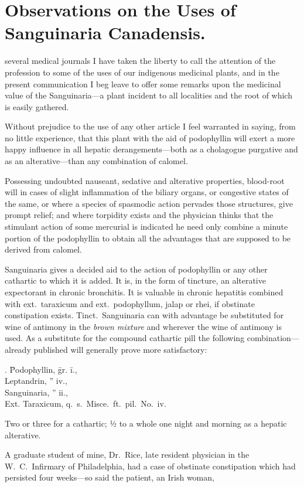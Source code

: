 \section{Observations on the Uses of Sanguinaria
Canadensis.}


 several medical journals I have taken the liberty to call the attention
of the profession to some of the uses of our indigenous medicinal
plants, and in the present communication I beg leave to offer some
remarks upon the medicinal value of the Sanguinaria---a plant incident
to all localities and the root of which is easily gathered.

Without prejudice to the use of any other article I feel warranted in
saying, from no little experience, that this plant with the aid of podophyllin
will exert a more happy influence in all hepatic derangements---both
as a cholagogue purgative and as an alterative---than any combination
of calomel.

Possessing undoubted nauseant, sedative and alterative properties,
blood-root will in cases of slight inflammation of the biliary organs, or
congestive states of the same, or where a species of spasmodic action
pervades those structures, give prompt relief; and where torpidity
exists and the physician thinks that the stimulant action of some mercurial
is indicated he need only combine a minute portion of the
podophyllin to obtain all the advantages that are supposed to be
derived from calomel.

Sanguinaria gives a decided aid to the action of podophyllin or any
other cathartic to which it is added.   It is, in the form of tincture, an
alterative expectorant in chronic bronchitis.   It is valuable in chronic
hepatitis combined with ext.\ taraxicum and ext.\ podophyllum, jalap or
rhei, if obstinate constipation exists.    Tinct.\ Sanguinaria can with
advantage be substituted for wine of antimony in the \emph{brown mixture}
and wherever the wine of antimony is used.   As a substitute for the
compound cathartic pill the following combination---already published
will generally prove more satisfactory:

\begin{center}
\begin{tabbing}
  \prescription. \= Podophyllin, \= gr. \= i., \\
    \> Leptandrin, \> ''\> iv., \\
    \> Sanguinaria, \> ''\> ii., \\
    \> Ext. Taraxicum, q.\ s.\ Misce.\ ft.\ pil.\ No.\ iv. \\
\end{tabbing}
\end{center}
Two or three for a cathartic; ½ to a whole one night and morning as a
hepatic alterative.

A graduate student of mine, Dr.\ Rice, late resident physician in the
W.~C.\ Infirmary of Philadelphia, had a case of obstinate constipation
which had persisted four weeks---so said the patient, an Irish woman,\endinput